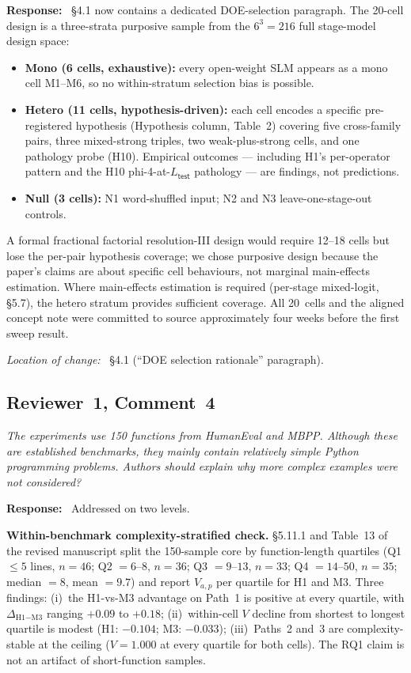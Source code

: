 \documentclass[11pt,a4paper]{article}
\newenvironment{reviewerquote}
  {\begin{tcolorbox}[colback=black!5, colframe=black!15, boxrule=0.3pt,
                     arc=1pt, left=6pt, right=6pt, top=3pt, bottom=3pt,
                     breakable]\itshape\small}
  {\end{tcolorbox}}
\newcommand{\rcomment}[2]{\subsection*{Reviewer~#1, Comment~#2}}
\newcommand{\response}{\noindent\textbf{Response:}\ }
\newcommand{\loc}{\par\smallskip\noindent\textit{Location of change:}\ }
\begin{document}
\response{}
\S4.1 now contains a dedicated DOE-selection paragraph. The 20-cell design is a three-strata purposive sample from the $6^3 = 216$ full stage-model design space:
\begin{itemize}
  \item \textbf{Mono (6 cells, exhaustive):} every open-weight SLM appears as a mono cell M1--M6, so no within-stratum selection bias is possible.
  \item \textbf{Hetero (11 cells, hypothesis-driven):} each cell encodes a specific pre-registered hypothesis (Hypothesis column, Table~2) covering five cross-family pairs, three mixed-strong triples, two weak-plus-strong cells, and one pathology probe (H10). Empirical outcomes --- including H1's per-operator pattern and the H10 phi-4-at-$L_{\textsf{test}}$ pathology --- are findings, not predictions.
  \item \textbf{Null (3 cells):} N1 word-shuffled input; N2 and N3 leave-one-stage-out controls.
\end{itemize}
A formal fractional factorial resolution-III design would require 12--18 cells but lose the per-pair hypothesis coverage; we chose purposive design because the paper's claims are about specific cell behaviours, not marginal main-effects estimation. Where main-effects estimation is required (per-stage mixed-logit, \S5.7), the hetero stratum provides sufficient coverage. All 20~cells and the aligned concept note were committed to source approximately four weeks before the first sweep result.

\loc{} \S4.1 (``DOE selection rationale'' paragraph).

\rcomment{1}{4}

\begin{reviewerquote}
The experiments use 150 functions from HumanEval and MBPP. Although these are established benchmarks, they mainly contain relatively simple Python programming problems. Authors should explain why more complex examples were not considered?
\end{reviewerquote}

\response{}
Addressed on two levels.

\textbf{Within-benchmark complexity-stratified check.} \S5.11.1 and Table~13 of the revised manuscript split the 150-sample core by function-length quartiles (Q1 $\leq 5$ lines, $n = 46$; Q2 $= 6$--$8$, $n = 36$; Q3 $= 9$--$13$, $n = 33$; Q4 $= 14$--$50$, $n = 35$; median $= 8$, mean $= 9.7$) and report $V_{a,p}$ per quartile for H1 and M3. Three findings: (i)~the H1-vs-M3 advantage on Path~1 is positive at every quartile, with $\Delta_{\text{H1}-\text{M3}}$ ranging $+0.09$ to $+0.18$; (ii)~within-cell $V$ decline from shortest to longest quartile is modest (H1: $-0.104$; M3: $-0.033$); (iii)~Paths~2 and~3 are complexity-stable at the ceiling ($V = 1.000$ at every quartile for both cells). The RQ1 claim is not an artifact of short-function samples.
\end{document}
